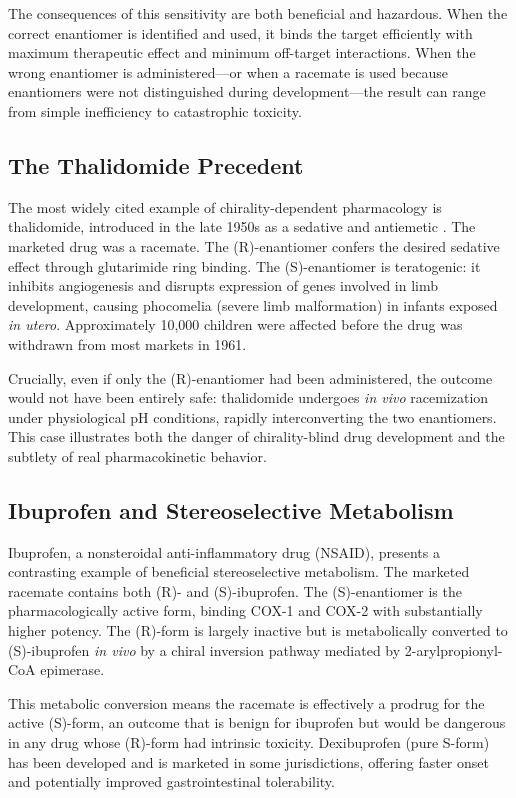 \documentclass[11pt,a4paper]{article}
\begin{document}
The consequences of this sensitivity are both beneficial and hazardous. When the
correct enantiomer is identified and used, it binds the target efficiently with
maximum therapeutic effect and minimum off-target interactions. When the wrong
enantiomer is administered---or when a racemate is used because enantiomers were
not distinguished during development---the result can range from simple
inefficiency to catastrophic toxicity.

\subsection{The Thalidomide Precedent}

The most widely cited example of chirality-dependent pharmacology is thalidomide,
introduced in the late 1950s as a sedative and antiemetic \cite{thalidomide1961}.
The marketed drug was a racemate. The (R)-enantiomer confers the desired sedative
effect through glutarimide ring binding. The (S)-enantiomer is teratogenic:
it inhibits angiogenesis and disrupts expression of genes involved in limb
development, causing phocomelia (severe limb malformation) in infants exposed
\textit{in utero}. Approximately 10,000 children were affected before the drug
was withdrawn from most markets in 1961.

Crucially, even if only the (R)-enantiomer had been administered, the outcome
would not have been entirely safe: thalidomide undergoes \textit{in vivo}
racemization under physiological pH conditions, rapidly interconverting the two
enantiomers. This case illustrates both the danger of chirality-blind drug
development and the subtlety of real pharmacokinetic behavior.

\subsection{Ibuprofen and Stereoselective Metabolism}

Ibuprofen, a nonsteroidal anti-inflammatory drug (NSAID), presents a contrasting
example of beneficial stereoselective metabolism. The marketed racemate contains
both (R)- and (S)-ibuprofen. The (S)-enantiomer is the pharmacologically active
form, binding COX-1 and COX-2 with substantially higher potency. The (R)-form
is largely inactive but is metabolically converted to (S)-ibuprofen \textit{in vivo}
by a chiral inversion pathway mediated by 2-arylpropionyl-CoA epimerase.

This metabolic conversion means the racemate is effectively a prodrug for the
active (S)-form, an outcome that is benign for ibuprofen but would be dangerous
in any drug whose (R)-form had intrinsic toxicity. Dexibuprofen (pure S-form) has
been developed and is marketed in some jurisdictions, offering faster onset and
potentially improved gastrointestinal tolerability.
\end{document}
